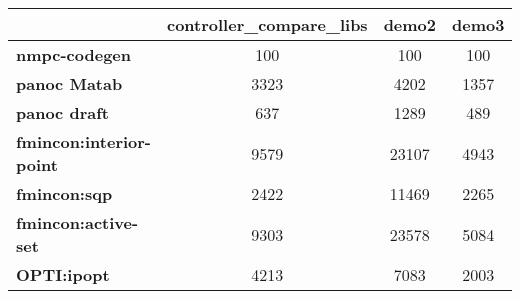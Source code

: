 \begin{tiny}\begin{tabular}{|l|c|c|c|}
\hline
&\textbf{controller_compare_libs}&\textbf{demo2}&\textbf{demo3}\\\hline
\textbf{nmpc-codegen}&100&100&100\\\hline
\textbf{panoc Matab}&3323&4202&1357\\\hline
\textbf{panoc draft}&637&1289&489\\\hline
\textbf{fmincon:interior-point}&9579&23107&4943\\\hline
\textbf{fmincon:sqp}&2422&11469&2265\\\hline
\textbf{fmincon:active-set}&9303&23578&5084\\\hline
\textbf{OPTI:ipopt}&4213&7083&2003\\\hline
\end{tabular}
\end{tiny}